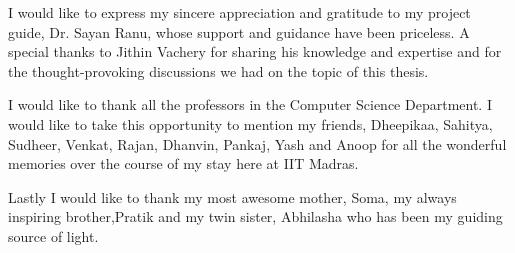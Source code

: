 I would like to express my sincere appreciation and gratitude to my project guide, Dr. Sayan Ranu, whose support and guidance have been priceless. A special thanks to Jithin Vachery for sharing his knowledge and expertise and for the thought-provoking discussions we had on the topic of this thesis.

I would like to thank all the professors in the Computer Science Department. I would like to take this opportunity to mention my friends, Dheepikaa, Sahitya, Sudheer, Venkat, Rajan, Dhanvin, Pankaj, Yash and Anoop for all the wonderful memories over the course of my stay here at IIT Madras.

Lastly I would like to thank my most awesome mother, Soma, my always inspiring brother,Pratik and my twin sister, Abhilasha who has been my guiding source of light.
      